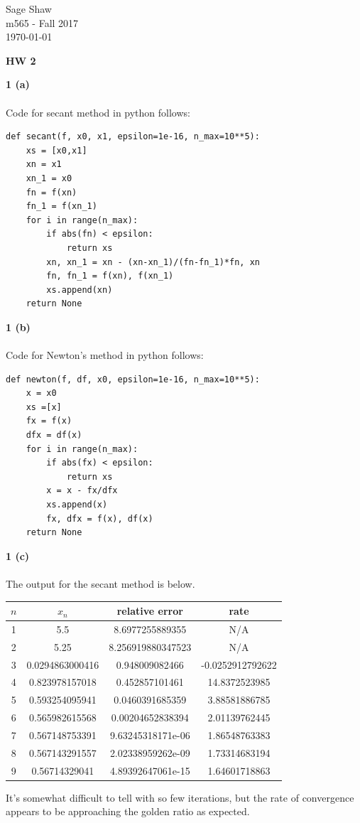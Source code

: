 \documentclass[12pt]{article}
\newcommand{\problem}[1]{\hspace{-4 ex} \large \textbf{#1}\\}
\begin{document}
	\thispagestyle{empty}
	
	\begin{flushright}
		Sage Shaw \\
		m565 - Fall 2017 \\
		\today
	\end{flushright}
	
{\large \textbf{HW 2}}\bigbreak

\problem{1 (a)}\\
	Code for secant method in python follows:
	\singlespacing
	\begin{lstlisting}
def secant(f, x0, x1, epsilon=1e-16, n_max=10**5):
	xs = [x0,x1]
	xn = x1
	xn_1 = x0
	fn = f(xn)
	fn_1 = f(xn_1)
	for i in range(n_max):
		if abs(fn) < epsilon:
			return xs
		xn, xn_1 = xn - (xn-xn_1)/(fn-fn_1)*fn, xn
		fn, fn_1 = f(xn), f(xn_1)
		xs.append(xn)
	return None
	\end{lstlisting}
	\doublespacing
	
\problem{1 (b)}\\
	Code for Newton's method in python follows:
	\singlespacing
	\begin{lstlisting}
def newton(f, df, x0, epsilon=1e-16, n_max=10**5):
	x = x0
	xs =[x]
	fx = f(x)
	dfx = df(x)
	for i in range(n_max):
		if abs(fx) < epsilon:
			return xs
		x = x - fx/dfx
		xs.append(x)
		fx, dfx = f(x), df(x)
	return None
	\end{lstlisting}
	\doublespacing
\problem{1 (c)}\\
	The output for the secant method is below.
	\begin{center}
		\begin{tabular}{|c|c|c|c|}
			\hline
			$n$&$x_n$&relative error&rate\\ \hline
			1&5.5&8.6977255889355&N/A\\ \hline
			2&5.25&8.256919880347523&N/A\\ \hline
			3&0.0294863000416&0.948009082466&-0.0252912792622\\ \hline
			4&0.823978157018&0.452857101461&14.8372523985\\ \hline
			5&0.593254095941&0.0460391685359&3.88581886785\\ \hline
			6&0.565982615568&0.00204652838394&2.01139762445\\ \hline
			7&0.567148753391&9.63245318171e-06&1.86548763383\\ \hline
			8&0.567143291557&2.02338959262e-09&1.73314683194\\ \hline
			9&0.56714329041&4.89392647061e-15&1.64601718863\\ \hline
		\end{tabular}
	\end{center}
	It's somewhat difficult to tell with so few iterations, but the rate of convergence appears to be approaching the golden ratio as expected.
\end{document}
